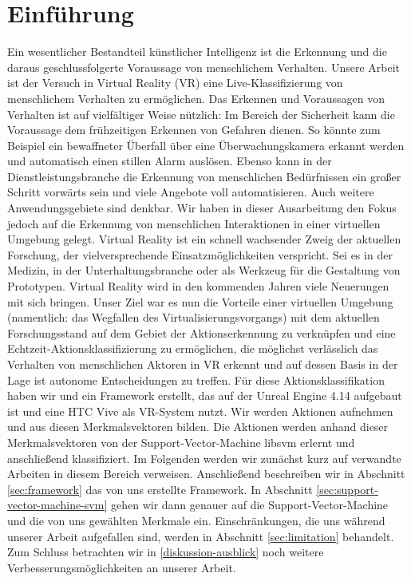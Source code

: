 
\section{Einführung}

Ein wesentlicher Bestandteil künstlicher Intelligenz ist die Erkennung und die daraus geschlussfolgerte Voraussage von menschlichem Verhalten. Unsere Arbeit ist der Versuch in Virtual Reality (VR) eine Live-Klassifizierung von menschlichem Verhalten zu ermöglichen.\newline
Das Erkennen und Voraussagen von Verhalten ist auf vielfältiger Weise nützlich: Im Bereich der Sicherheit kann die Voraussage dem frühzeitigen Erkennen von Gefahren dienen. So könnte zum Beispiel ein bewaffneter Überfall über eine Überwachungskamera erkannt werden und automatisch einen stillen Alarm auslösen. Ebenso kann in der Dienstleistungsbranche die Erkennung von menschlichen Bedürfnissen ein großer Schritt vorwärts sein und viele Angebote voll automatisieren. Auch weitere Anwendungsgebiete sind denkbar. Wir haben in dieser Ausarbeitung den Fokus jedoch auf die Erkennung von menschlichen Interaktionen in einer virtuellen Umgebung gelegt.\newline
Virtual Reality ist ein schnell wachsender Zweig der aktuellen Forschung, der vielversprechende Einsatzmöglichkeiten verspricht. Sei es in der Medizin, in der Unterhaltungsbranche oder als Werkzeug für die Gestaltung von Prototypen. Virtual Reality wird in den kommenden Jahren viele Neuerungen mit sich bringen. Unser Ziel war es nun die Vorteile einer virtuellen Umgebung (namentlich: das Wegfallen des Virtualisierungsvorgangs) mit dem aktuellen Forschungsstand auf dem Gebiet der Aktionserkennung zu verknüpfen und eine Echtzeit-Aktionsklassifizierung zu ermöglichen, die möglichst verlässlich das Verhalten von menschlichen Aktoren in VR erkennt und auf dessen Basis in der Lage ist autonome Entscheidungen zu treffen. Für diese Aktionsklassifikation haben wir und ein Framework erstellt, das auf der Unreal Engine 4.14 aufgebaut ist und eine HTC Vive als VR-System nutzt. Wir werden Aktionen aufnehmen und aus diesen Merkmalsvektoren bilden. Die Aktionen werden anhand dieser Merkmalsvektoren von der Support-Vector-Machine libsvm erlernt und anschließend klassifiziert.\newline
Im Folgenden werden wir zunächst kurz auf verwandte Arbeiten in diesem Bereich verweisen. Anschließend beschreiben wir in Abschnitt \ref{sec:framework} das von uns erstellte Framework. In Abschnitt \ref{sec:support-vector-machine-svm} gehen wir dann genauer auf die Support-Vector-Machine und die von uns gewählten Merkmale ein. Einschränkungen, die uns während unserer Arbeit aufgefallen sind, werden in Abschnitt \ref{sec:limitation} behandelt. Zum Schluss betrachten wir in \ref{diskussion-ausblick} noch weitere Verbesserungsmöglichkeiten an unserer Arbeit.

